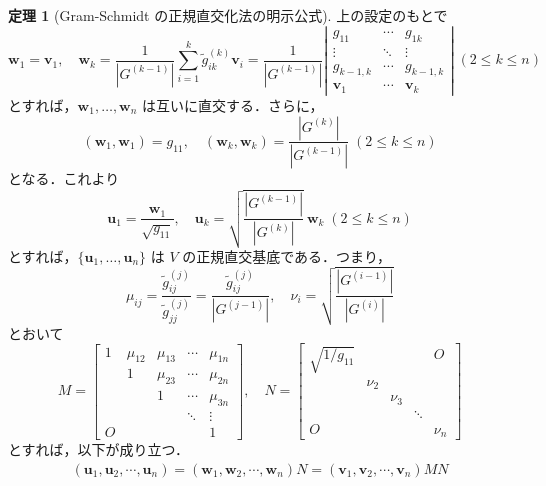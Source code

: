 \documentclass[11pt, uplatex, dvipdfmx]{jsarticle}
\theoremstyle{definition}
\newtheorem*{theorem*}{定理}
\begin{document}
\begin{theorem*}[Gram-Schmidt の正規直交化法の明示公式]
  上の設定のもとで
  \[
    \bm{w}_1= \bm{v}_1, \quad \bm{w}_k =
    \frac{1}{\left|G^{(k-1)}\right|} \sum_{i=1}^{k}
    \tilde{g}^{(k)}_{ik} \bm{v}_i = \frac{1}{\left|G^{(k-1)}\right|}\left|
      \begin{array}{ccc}
        g_{11} & \cdots & g_{1k}\\
        \vdots & \ddots & \vdots\\
        g_{k-1,k} & \cdots & g_{k-1, k}\\
        \bm{v}_1 & \cdots & \bm{v}_k
      \end{array}
    \right| \; ( 2 \leq k \leq n)
  \]
  とすれば，$\bm{w}_1, \ldots, \bm{w}_n$ は互いに直交する．さらに，
  \[
    (\bm{w}_1, \bm{w}_1) = g_{11}, \quad (\bm{w}_k, \bm{w}_k) =
    \frac{\left| G^{(k)}\right|}{\left|G^{(k-1)}\right|} \; (2 \leq k \leq n)
  \]
  となる．これより
  \[
    \bm{u}_1 = \frac{\bm{w}_1}{\sqrt{g_{11}}}, \quad \bm{u}_k =
    \sqrt{\frac{\left|G^{(k-1)}\right|}{\left|G^{(k)}\right|}}~ \bm{w}_k \; (2 \leq k \leq n)
  \]
  とすれば，$\{\bm{u}_1, \ldots, \bm{u}_n\}$ は $V$ の正規直交基底である．つまり，
  \[
    \mu_{ij} = \frac{\tilde{g}^{(j)}_{ij}}{\tilde{g}^{(j)}_{jj}}
    = \frac{\tilde{g}^{(j)}_{ij}}{\left|G^{(j-1)}\right|}, \quad
    \nu_{i} = \sqrt{\frac{\left|G^{(i-1)}\right|}{\left|G^{(i)}\right|}}
  \]
  とおいて
  \[
    M = \left[
      \begin{array}{ccccc}
        1 & \mu_{12} & \mu_{13} & \cdots & \mu_{1n}\\
         & 1 & \mu_{23} & \cdots & \mu_{2n}\\
         &  & 1 & \cdots & \mu_{3n}\\
         &  &  & \ddots & \vdots\\
        O &  &  &  & 1
      \end{array}
    \right], \quad N= \left[
      \begin{array}{ccccc}
        \sqrt{1/g_{11}} & & & & O\\
                        & \nu_{2} & & & \\
                        & & \nu_{3} & &\\
                        & && \ddots & \\
        O & & &&  \nu_{n}
      \end{array}
    \right]
  \]
  とすれば，以下が成り立つ．
  \[
    \begin{aligned}
      \left(\bm{u}_1, \bm{u}_2, \cdots, \bm{u}_n\right) = \left(\bm{w}_1, \bm{w}_2, \cdots, \bm{w}_n\right) N=
    \left( \bm{v}_1 , \bm{v}_2, \cdots, \bm{v}_n\right)MN
  \end{aligned}
  \]
\end{theorem*}
\end{document}
